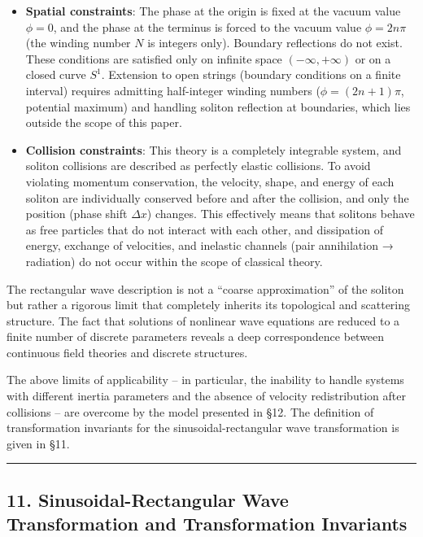\documentclass[a4paper,11pt]{article}
\providecommand{\tightlist}{\setlength{\itemsep}{0pt}\setlength{\parskip}{0pt}}
\begin{document}
\begin{itemize}
\tightlist
\item
  \textbf{Spatial constraints}: The phase at the origin is fixed at the
  vacuum value \(\phi = 0\), and the phase at the terminus is forced to
  the vacuum value \(\phi = 2n\pi\) (the winding number \(N\) is
  integers only). Boundary reflections do not exist. These conditions
  are satisfied only on infinite space \((-\infty, +\infty)\) or on a
  closed curve \(S^1\). Extension to open strings (boundary conditions
  on a finite interval) requires admitting half-integer winding numbers
  (\(\phi = (2n+1)\pi\), potential maximum) and handling soliton
  reflection at boundaries, which lies outside the scope of this paper.
\item
  \textbf{Collision constraints}: This theory is a completely integrable
  system, and soliton collisions are described as perfectly elastic
  collisions. To avoid violating momentum conservation, the velocity,
  shape, and energy of each soliton are individually conserved before
  and after the collision, and only the position (phase shift
  \(\Delta x\)) changes. This effectively means that solitons behave as
  free particles that do not interact with each other, and dissipation
  of energy, exchange of velocities, and inelastic channels (pair
  annihilation → radiation) do not occur within the scope of classical
  theory.
\end{itemize}

The rectangular wave description is not a ``coarse approximation'' of
the soliton but rather a rigorous limit that completely inherits its
topological and scattering structure. The fact that solutions of
nonlinear wave equations are reduced to a finite number of discrete
parameters reveals a deep correspondence between continuous field
theories and discrete structures.

The above limits of applicability -- in particular, the inability to
handle systems with different inertia parameters and the absence of
velocity redistribution after collisions -- are overcome by the model
presented in §12. The definition of transformation invariants for the
sinusoidal-rectangular wave transformation is given in §11.

\begin{center}\rule{0.5\linewidth}{0.5pt}\end{center}

\subsection{11. Sinusoidal-Rectangular Wave Transformation and
Transformation
Invariants}\label{sinusoidal-rectangular-wave-transformation-and-transformation-invariants}
\end{document}
